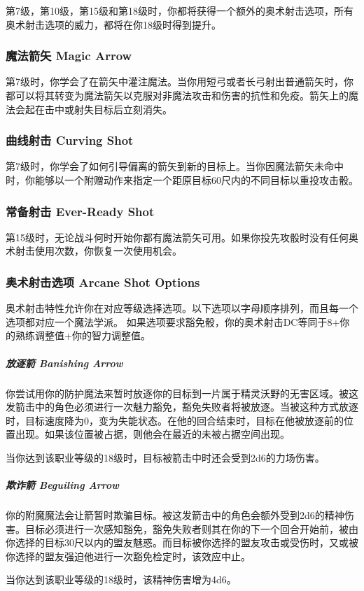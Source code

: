 第7级，第10级，第15级和第18级时，你都将获得一个额外的奥术射击选项，所有奥术射击选项的威力，都将在你18级时得到提升。

\subsubsection{魔法箭矢 Magic Arrow}
第7级时，你学会了在箭矢中灌注魔法。当你用短弓或者长弓射出普通箭矢时，你都可以将其转变为魔法箭矢以克服对非魔法攻击和伤害的抗性和免疫。箭矢上的魔法会起在击中或射失目标后立刻消失。

\subsubsection{曲线射击 Curving Shot}
第7级时，你学会了如何引导偏离的箭矢到新的目标上。当你因魔法箭矢未命中时，你能够以一个附赠动作来指定一个距原目标60尺内的不同目标以重投攻击骰。

\subsubsection{常备射击 Ever-Ready Shot}第15级时，无论战斗何时开始你都有魔法箭矢可用。如果你投先攻骰时没有任何奥术射击使用次数，你恢复一次使用机会。

\subsubsection{奥术射击选项 Arcane Shot Options}奥术射击特性允许你在对应等级选择选项。以下选项以字母顺序排列，而且每一个选项都对应一个魔法学派。
如果选项要求豁免骰，你的奥术射击DC等同于8+你的熟练调整值+你的智力调整值。

\subparagraph{放逐箭 Banishing Arrow}你尝试用你的防护魔法来暂时放逐你的目标到一片属于精灵沃野的无害区域。被这发箭击中的角色必须进行一次魅力豁免，豁免失败者将被放逐。当被这种方式放逐时，目标速度降为0，变为失能状态。在他的回合结束时，目标在他被放逐前的位置出现。如果该位置被占据，则他会在最近的未被占据空间出现。

当你达到该职业等级的18级时，目标被箭击中时还会受到2d6的力场伤害。

\subparagraph{欺诈箭 Beguiling Arrow}你的附魔魔法会让箭暂时欺骗目标。被这发箭击中的角色会额外受到2d6的精神伤害。目标必须进行一次感知豁免，豁免失败者则其在你的下一个回合开始前，被由你选择的目标30尺以内的盟友魅惑。而目标被你选择的盟友攻击或受伤时，又或被你选择的盟友强迫他进行一次豁免检定时，该效应中止。

当你达到该职业等级的18级时，该精神伤害增为4d6。


